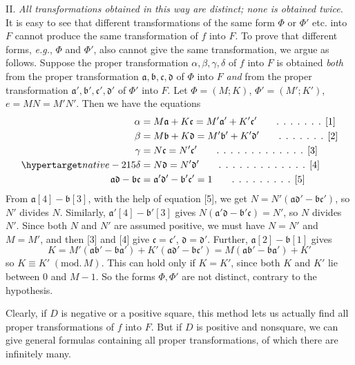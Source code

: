 II. \textit{All transformations obtained in this way are distinct; none is obtained twice.} It is easy to see that different transformations of the same form $\Phi$ or $\Phi'$ etc. into $F$ cannot produce the same transformation of $f$ into $F$. To prove that different forms, \textit{e.g.}, $\Phi$ and $\Phi'$, also cannot give the same transformation, we argue as follows. Suppose the proper transformation $\alpha,\beta,\gamma,\delta$ of $f$ into $F$ is obtained \textit{both} from the proper transformation $\mathfrak{a},\mathfrak{b},\mathfrak{c},\mathfrak{d}$ of $\Phi$ into $F$ \textit{and} from the proper transformation $\mathfrak{a}',\mathfrak{b}',\mathfrak{c}',\mathfrak{d}'$ of $\Phi'$ into $F$. Let $\Phi=(M;K)$, $\Phi'=(M';K')$, $e=MN=M'N'$. Then we have the equations
\begin{align*}
\alpha&=M\mathfrak{a}+K\mathfrak{c}=M'\mathfrak{a}'+K'\mathfrak{c}' \tag*{. . . . . . . [1]}\\
\beta&=M\mathfrak{b}+K\mathfrak{d}=M'\mathfrak{b}'+K'\mathfrak{d}' \tag*{. . . . . . . [2]}\\
\gamma&=N\mathfrak{c}=N'\mathfrak{c}' \tag*{. . . . . . . . . . . . . [3]}
\\
\SourceLeaf{215}\delta&=N\mathfrak{d}=N'\mathfrak{d}' \tag*{. . . . . . . . . . . . . [4]}\\
\mathfrak{a}\mathfrak{d}-\mathfrak{b}\mathfrak{c}&=\mathfrak{a}'\mathfrak{d}'-\mathfrak{b}'\mathfrak{c}'=1 \tag*{. . . . . . . . . [5]}
\end{align*}
From $\mathfrak{a}[4]-\mathfrak{b}[3]$, with the help of equation [5], we get $N=N'(\mathfrak{a}\mathfrak{d}'-\mathfrak{b}\mathfrak{c}')$, so $N'$ divides $N$. Similarly, $\mathfrak{a}'[4]-\mathfrak{b}'[3]$ gives $N(\mathfrak{a}'\mathfrak{d}-\mathfrak{b}'\mathfrak{c})=N'$, so $N$ divides $N'$. Since both $N$ and $N'$ are assumed positive, we must have $N=N'$ and $M=M'$, and then [3] and [4] give $\mathfrak{c}=\mathfrak{c}'$, $\mathfrak{d}=\mathfrak{d}'$. Further, $\mathfrak{a}[2]-\mathfrak{b}[1]$ gives
\[
K=M'(\mathfrak{a}\mathfrak{b}'-\mathfrak{b}\mathfrak{a}')+K'(\mathfrak{a}\mathfrak{d}'-\mathfrak{b}\mathfrak{c}')=M(\mathfrak{a}\mathfrak{b}'-\mathfrak{b}\mathfrak{a}')+K'
\]
so $K\equiv K'\;(\mathrm{mod.}\,M)$. This can hold only if $K=K'$, since both $K$ and $K'$ lie between 0 and $M-1$. So the forms $\Phi,\Phi'$ are not distinct, contrary to the hypothesis.

Clearly, if $D$ is negative or a positive square, this method lets us actually find all proper transformations of $f$ into $F$. But if $D$ is positive and nonsquare, we can give general formulas containing all proper transformations, of which there are infinitely many.

